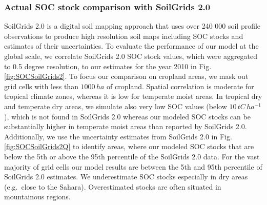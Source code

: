 \documentclass[gc, manuscript]{copernicus}
\begin{document}
\hypertarget{actual-soc-stock-comparison-with-soilgrids-2.0}{%
\subsubsection{Actual SOC stock comparison with SoilGrids 2.0}\label{actual-soc-stock-comparison-with-soilgrids-2.0}}

SoilGrids 2.0 \citep{poggio_soilgrids_2021} is a digital soil mapping approach that uses over 240 000 soil profile observations to produce high resolution soil maps including SOC stocks and estimates of their uncertainties. To evaluate the performance of our model at the global scale, we correlate SoilGrids 2.0 SOC stock values, which were aggregated to 0.5 degree resolution, to our estimates for the year 2010 in Fig. \ref{fig:SOCSoilGrids2}. To focus our comparison on cropland areas, we mask out grid cells with less than \(1000\,\unit{ha}\) of cropland. Spatial correlation is moderate for tropical climate zones, whereas it is low for temperate moist areas. In tropical dry and temperate dry areas, we simulate also very low SOC values (below \(10\,\unit{tC\,ha^{-1}}\)), which is not found in SoilGrids 2.0 whereas our modeled SOC stocks can be substantially higher in temperate moist areas than reported by SoilGrids 2.0.
Additionally, we use the uncertainty estimates from SoilGrids 2.0 in Fig. \ref{fig:SOCSoilGrids2Q} to identify areas, where our modeled SOC stocks that are below the 5th or above the 95th percentile of the SoilGrids 2.0 data.
For the vast majority of grid cells our model results are between the 5th and 95th percentile of SoilGrids 2.0 estimates. We underestimate SOC stocks especially in dry areas (e.g.~close to the Sahara). Overestimated stocks are often situated in mountainous regions.
\end{document}
